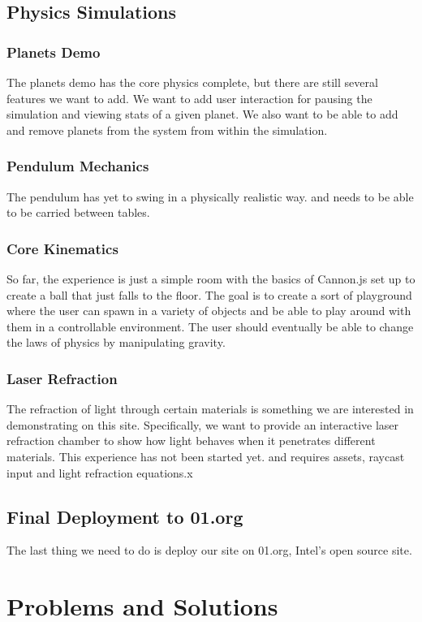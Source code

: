 \documentclass[onecolumn, draftclsnofoot,10pt, compsoc]{IEEEtran}
\begin{document}
\subsection{Physics Simulations}
\subsubsection{Planets Demo}
The planets demo has the core physics complete, but there are still several features we want to add. We want to add user interaction for pausing the simulation and viewing stats of a given planet. We also want to be able to add and remove planets from the system from within the simulation.
\subsubsection{Pendulum Mechanics}
The pendulum has yet to swing in a physically realistic way.  and needs to be able to be carried between tables.
\subsubsection{Core Kinematics}
So far, the experience is just a simple room with the basics of Cannon.js set up to create a ball that just falls to the floor. The goal is to create a sort of playground where the user can spawn in a variety of objects and be able to play around with them in a controllable environment. The user should eventually be able to change the laws of physics by manipulating gravity.
\subsubsection{Laser Refraction}
The refraction of light through certain materials is something we are interested in demonstrating on this site. Specifically, we want to provide an interactive laser refraction chamber to show how light behaves when it penetrates different materials. This experience has not been started yet. and requires assets, raycast input and light refraction equations.x
\subsection{Final Deployment to 01.org}
The last thing we need to do is deploy our site on 01.org, Intel's open source site. 

\section{Problems and Solutions}
\end{document}
